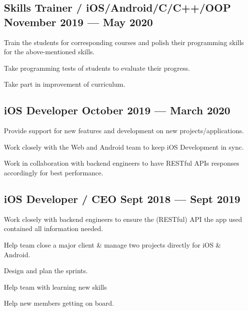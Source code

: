 \documentclass[letter,10pt]{article}
\begin{document}
\subsection{{Skills Trainer / iOS/Android/C/C++/OOP \hfill November 2019 --- May 2020}}
\begin{zitemize}
\item Train the students for corresponding courses and polish their programming skills for the above-mentioned skills.
\item Take programming tests of students to evaluate their progress.
\item Take part in improvement of curriculum.
\end{zitemize}

\subsection{{iOS Developer \hfill October 2019 --- March 2020}}
\begin{zitemize}
\item Provide support for new features and development on new projects/applications.
\item Work closely with the Web and Android team to keep iOS Development in sync.
\item Work in collaboration with backend engineers to have RESTful APIs responses accordingly for best performance.
\end{zitemize}

\subsection{{iOS Developer / CEO \hfill Sept 2018 --- Sept 2019}}
\begin{zitemize}
\item Work closely with backend engineers to ensure the (RESTful) API the app used contained all information needed.
\item Help team close a major client \& manage two projects directly for iOS \& Android.
\item Design and plan the sprints.
\item Help team with learning new skills
\item Help new members getting on board.
\end{zitemize}
\end{document}
